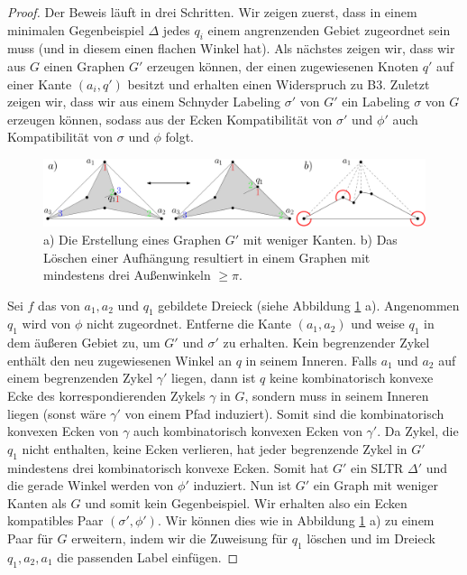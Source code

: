 \begin{proof}
Der Beweis läuft in drei Schritten. Wir zeigen zuerst, dass in einem minimalen Gegenbeispiel $\Delta$ jedes $q_i$ einem angrenzenden Gebiet zugeordnet sein muss (und in diesem einen flachen Winkel hat). Als nächstes zeigen wir, dass wir aus $G$ einen Graphen $G'$ erzeugen können, der einen zugewiesenen Knoten $q'$ auf einer Kante $(a_i,q')$ besitzt und erhalten einen Widerspruch zu B3. Zuletzt zeigen wir, dass wir aus einem Schnyder Labeling $\sigma'$ von $G'$ ein Labeling $\sigma$ von $G$ erzeugen können, sodass aus der Ecken Kompatibilität von $\sigma'$ und $\phi'$ auch Kompatibilität von $\sigma$ und $\phi$ folgt.

\begin{figure}
	\centering
	  \includegraphics[width=1\textwidth]{lem6_1.png}
    	\caption{a) Die Erstellung eines Graphen $G'$ mit weniger Kanten. b) Das Löschen einer Aufhängung resultiert in einem Graphen mit mindestens drei Außenwinkeln $\geq \pi$.}
    	\label{pic_lem6_1}
\end{figure}

Sei $f$ das von $a_1,a_2$ und $q_1$ gebildete Dreieck (siehe Abbildung \ref{pic_lem6_1} a). Angenommen $q_1$ wird von $\phi$ nicht zugeordnet. Entferne die Kante $(a_1,a_2)$ und weise $q_1$ in dem äußeren Gebiet zu, um $G'$ und $\sigma'$ zu erhalten. Kein begrenzender Zykel enthält den neu zugewiesenen Winkel an $q$ in seinem Inneren. Falls $a_1$ und $a_2$ auf einem begrenzenden Zykel $\gamma'$ liegen, dann ist $q$ keine kombinatorisch konvexe Ecke des korrespondierenden Zykels $\gamma$ in $G$, sondern muss in seinem Inneren liegen (sonst wäre $\gamma'$ von einem Pfad induziert). Somit sind die kombinatorisch konvexen Ecken von $\gamma$ auch kombinatorisch konvexen Ecken von $\gamma'$. Da Zykel, die $q_1$ nicht enthalten, keine Ecken verlieren, hat jeder begrenzende Zykel in $G'$ mindestens drei kombinatorisch konvexe Ecken. Somit hat $G'$ ein SLTR $\Delta'$ und die gerade Winkel werden von $\phi'$ induziert. Nun ist $G'$ ein Graph mit weniger Kanten als $G$ und somit kein Gegenbeispiel. Wir erhalten also ein Ecken kompatibles Paar $(\sigma',\phi')$. Wir können dies wie in Abbildung \ref{pic_lem6_1} a) zu einem Paar für $G$ erweitern, indem wir die Zuweisung für $q_1$ löschen und im Dreieck $q_1,a_2,a_1$ die passenden Label einfügen.


\end{proof}

